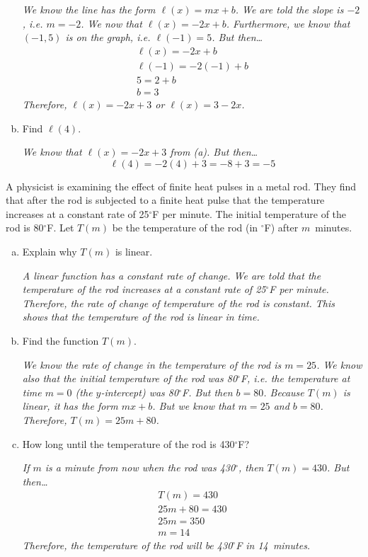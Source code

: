 \documentclass[12pt,letterpaper]{exam}
\begin{document}
\begin{questions}
\begin{enumerate}[(a)]
	{\itshape We know the line has the form $\ell(x)= mx + b$. We are told the slope is $-2$, i.e. $m= -2$. We now that $\ell(x)= -2x + b$. Furthermore, we know that $(-1, 5)$ is on the graph, i.e. $\ell(-1)= 5$. But then\dots
		\[
		\begin{gathered}
		\ell(x)= -2x + b \\
		\ell(-1)= -2(-1) + b \\
		5= 2 + b \\
		b= 3
		\end{gathered}
		\]
	Therefore, $\ell(x)= -2x + 3$ or $\ell(x)= 3 - 2x$.
	} \pvspace{4.55cm}

	\item Find $\ell(4)$. \pvspace{0.5cm}
	
	{\itshape We know that $\ell(x)= -2x + 3$ from (a). But then\dots
		\[
		\ell(4)= -2(4) + 3= -8 + 3= -5
		\]
	}
	\end{enumerate}



\newpage
\question[15] A physicist is examining the effect of finite heat pulses in a metal rod. They find that after the rod is subjected to a finite heat pulse that the temperature increases at a constant rate of 25$^\circ$F per minute. The initial temperature of the rod is 80$^\circ$F. Let $T(m)$ be the temperature of the rod (in $^\circ$F) after $m$~minutes. 
	\begin{enumerate}[(a)]
	\item Explain why $T(m)$ is linear. \pvspace{2cm}
	
	{\itshape A linear function has a constant rate of change. We are told that the temperature of the rod increases at a constant rate of 25$^\circ$F per minute. Therefore, the rate of change of temperature of the rod is constant. This shows that the temperature of the rod is linear in time.} \pvspace{2cm}
	
	\item Find the function $T(m)$. \pvspace{1.95cm}
	
	{\itshape We know the rate of change in the temperature of the rod is $m= 25$. We know also that the initial temperature of the rod was 80$^\circ$F, i.e. the temperature at time $m= 0$ (the $y$-intercept) was 80$^\circ$F. But then $b= 80$. Because $T(m)$ is linear, it has the form $mx + b$. But we know that $m= 25$ and $b= 80$. Therefore, $T(m)= 25m + 80$.} \pvspace{1.95cm}
	
	\item How long until the temperature of the rod is 430$^\circ$F? \pvspace{1cm}
	
	{\itshape If $m$ is a minute from now when the rod was 430$^\circ$, then $T(m)= 430$. But then\dots
		\[
		\begin{gathered}
		T(m)= 430 \\
		25m + 80= 430 \\
		25m= 350 \\
		m= 14
		\end{gathered}
		\]
	Therefore, the temperature of the rod will be 430$^\circ$F in 14~minutes. 
	}
	\end{enumerate}

\end{questions}
\end{document}
